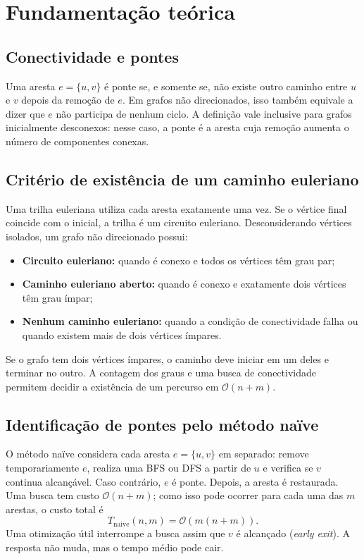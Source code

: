 \documentclass[12pt,a4paper]{article}
\newcommand{\ordem}[1]{\mathcal{O}\!\left(#1\right)}
\newcommand{\naive}{na\"ive}
\begin{document}
\section{Fundamentação teórica}
\subsection{Conectividade e pontes}
Uma aresta $e=\{u,v\}$ é ponte se, e somente se, não existe outro caminho
entre $u$ e $v$ depois da remoção de $e$. Em grafos não direcionados, isso
também equivale a dizer que $e$ não participa de nenhum ciclo.
A definição vale inclusive para grafos inicialmente desconexos: nesse caso,
a ponte é a aresta cuja remoção aumenta o número de componentes conexas.

\subsection{Critério de existência de um caminho euleriano}
Uma trilha euleriana utiliza cada aresta exatamente uma vez. Se o vértice
final coincide com o inicial, a trilha é um circuito euleriano.
Desconsiderando vértices isolados, um grafo não direcionado possui:
\begin{itemize}
  \item \textbf{Circuito euleriano:} quando é conexo e todos os vértices têm grau par;
  \item \textbf{Caminho euleriano aberto:} quando é conexo e exatamente dois vértices têm grau ímpar;
  \item \textbf{Nenhum caminho euleriano:} quando a condição de conectividade falha ou quando existem mais de dois vértices ímpares.
\end{itemize}
Se o grafo tem dois vértices ímpares, o caminho deve iniciar em um deles
e terminar no outro. A contagem dos graus e uma busca de conectividade
permitem decidir a existência de um percurso em $\ordem{n+m}$.

\subsection{Identificação de pontes pelo método naïve}
O método \naive{} considera cada aresta $e=\{u,v\}$ em separado:
remove temporariamente $e$, realiza uma BFS ou DFS a partir de $u$
e verifica se $v$ continua alcançável. Caso contrário, $e$ é ponte.
Depois, a aresta é restaurada. Uma busca tem custo $\ordem{n+m}$;
como isso pode ocorrer para cada uma das $m$ arestas, o custo total é
\begin{equation}
T_{\text{naive}}(n,m)=\ordem{m(n+m)}.
\end{equation}
Uma otimização útil interrompe a busca assim que $v$ é alcançado
(\emph{early exit}). A resposta não muda, mas o tempo médio pode cair.
\end{document}
